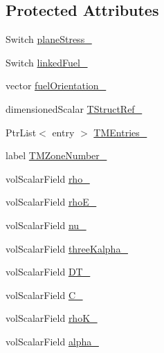 \subsection*{Protected Attributes}
\begin{DoxyCompactItemize}
\item 
Switch \hyperlink{classFoam_1_1linearElasticThermoMechanics_a4349c857f50a6d674dbf8b51a30b6a3e}{plane\+Stress\+\_\+}
\item 
Switch \hyperlink{classFoam_1_1linearElasticThermoMechanics_aef08ed176fa5b95b57eda825500d5257}{linked\+Fuel\+\_\+}
\item 
vector \hyperlink{classFoam_1_1linearElasticThermoMechanics_ae59d298f86f07d4194b18d4acba0bbf9}{fuel\+Orientation\+\_\+}
\item 
dimensioned\+Scalar \hyperlink{classFoam_1_1linearElasticThermoMechanics_a18af69ec764eda3ceeb4fa3b999fd5ac}{T\+Struct\+Ref\+\_\+}
\item 
Ptr\+List$<$ entry $>$ \hyperlink{classFoam_1_1linearElasticThermoMechanics_a683b1d262f0d9fe58ff61f40f68e7d95}{T\+M\+Entries\+\_\+}
\item 
label \hyperlink{classFoam_1_1linearElasticThermoMechanics_a96c94544cab43f18460f318185cf2e56}{T\+M\+Zone\+Number\+\_\+}
\item 
vol\+Scalar\+Field \hyperlink{classFoam_1_1linearElasticThermoMechanics_a074e4dd0196964d1c3865f6a96d9551b}{rho\+\_\+}
\item 
vol\+Scalar\+Field \hyperlink{classFoam_1_1linearElasticThermoMechanics_a451d3400ddfbf12827e81fa9e9b16d19}{rho\+E\+\_\+}
\item 
vol\+Scalar\+Field \hyperlink{classFoam_1_1linearElasticThermoMechanics_a3bd190eef3d0f9d315c80875787aea7e}{nu\+\_\+}
\item 
vol\+Scalar\+Field \hyperlink{classFoam_1_1linearElasticThermoMechanics_af6a2747881f39d98b386962988e610c7}{three\+Kalpha\+\_\+}
\item 
vol\+Scalar\+Field \hyperlink{classFoam_1_1linearElasticThermoMechanics_a80f5c7a1abc8b6efc5203b573640fc53}{D\+T\+\_\+}
\item 
vol\+Scalar\+Field \hyperlink{classFoam_1_1linearElasticThermoMechanics_a8ef66f4a046c5d95be51fccf57187679}{C\+\_\+}
\item 
vol\+Scalar\+Field \hyperlink{classFoam_1_1linearElasticThermoMechanics_ab6c875ea4e86831a3434a95ffa4ffe34}{rho\+K\+\_\+}
\item 
vol\+Scalar\+Field \hyperlink{classFoam_1_1linearElasticThermoMechanics_afc7f837218ee9a841a3667dbca785455}{alpha\+\_\+}

\end{DoxyCompactItemize}
